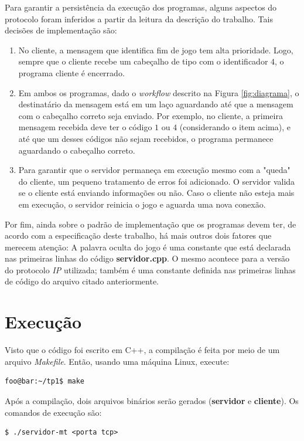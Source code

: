 \documentclass[10pt]{extarticle}
\begin{document}
Para garantir a persistência da execução dos programas, alguns aspectos do protocolo foram inferidos a partir da leitura da descrição do trabalho. Tais decisões de implementação são:
\begin{enumerate}
    \item No cliente, a mensagem que identifica fim de jogo tem alta prioridade. Logo, sempre que o cliente recebe um cabeçalho de tipo com o identificador $4$, o programa cliente é encerrado.
    \item Em ambos os programas, dado o \textit{workflow} descrito na Figura \ref{fig:diagrama}, o destinatário da mensagem está em um laço aguardando até que a mensagem com o cabeçalho correto seja enviado. Por exemplo, no cliente, a primeira mensagem recebida deve ter o código $1$ ou $4$ (considerando o item acima), e até que um desses códigos não sejam recebidos, o programa permanece aguardando o cabeçalho correto.
    \item Para garantir que o servidor permaneça em execução mesmo com a "queda" do cliente, um pequeno tratamento de erros foi adicionado. O servidor valida se o cliente está enviando informações ou não. Caso o cliente não esteja mais em execução, o servidor reinicia o jogo e aguarda uma nova conexão.
\end{enumerate}

Por fim, ainda sobre o padrão de implementação que os programas devem ter, de acordo com a especificação deste trabalho, há mais outros dois fatores que merecem atenção: A palavra oculta do jogo é uma constante que está declarada nas primeiras linhas do código \textbf{servidor.cpp}. O mesmo acontece para a versão do protocolo \textit{IP} utilizada; também é uma constante definida nas primeiras linhas de código do arquivo citado anteriormente.

\section{Execução}
Visto que o código foi escrito em C++, a compilação é feita por meio de um arquivo \textit{Makefile}. Então, usando uma máquina Linux, execute:
\lstset{language=bash}
    \begin{lstlisting}[frame=single]
foo@bar:~/tp1$ make
    \end{lstlisting}

Após a compilação, dois arquivos binários serão gerados (\textbf{servidor} e \textbf{cliente}). Os comandos de execução são:
\lstset{language=bash}
    \begin{lstlisting}[frame=single]
$ ./servidor-mt <porta tcp>
    \end{lstlisting}
\end{document}
